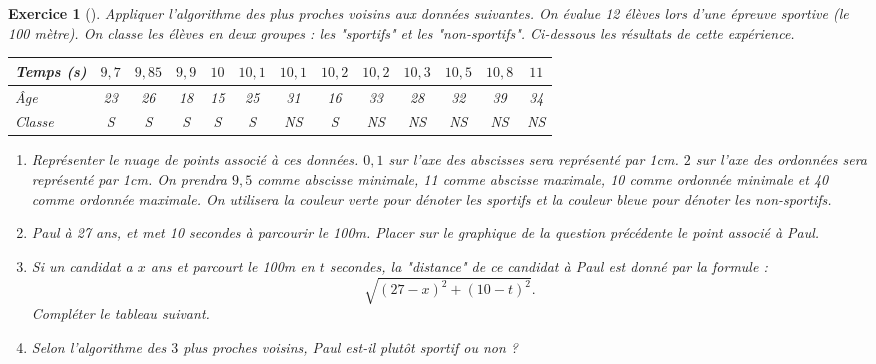 \documentclass[12pt]{article}                   %
\newcounter{exoscount}
\theoremstyle{exercicestyle}
\newtheorem{exos}[exoscount]{Exercice}
\newenvironment{exo}[2]
  {
   \begin{exos}[#1]
   \leavevmode
   \marginpar{\hfill $#2 $ }}
  {\end{exos}}
\theoremstyle{break2}
\theoremstyle{break3}
\begin{document}
\begin{exo}{}{  }
    Appliquer l'algorithme des plus proches voisins aux données suivantes. On évalue 12 élèves lors d'une épreuve sportive (le 100 mètre). On classe les élèves en deux groupes : les "sportifs" et les "non-sportifs". Ci-dessous les résultats de cette expérience.

    \begin{center}
        \renewcommand{\arraystretch}{1.5}
    \begin{tabular}{|M{2cm}|c|c|c|c|c|c|c|c|c|c|c|c|}
        \hline
        Temps (s) & $9,7$ & $9,85$ & $9,9$ & $10$ & $10,1$ & $10,1$ & $10,2$ & $10,2$ & $10,3$ & $10,5$ & $10,8$ & $11$ \\
    \hline
    Âge & 23 & 26 & 18 & 15 & 25 & 31 & 16 & 33 & 28 & 32 & 39 & 34 \\
    \hline 
    Classe & S & S & S & S & S & NS & S & NS & NS & NS & NS & NS \\
    \hline 
    \end{tabular}
    \end{center}

    \begin{enumerate}
        \item Représenter le nuage de points associé à ces données. $0,1$ sur l'axe des abscisses sera représenté par 1cm. $2$ sur l'axe des ordonnées sera représenté par 1cm. On prendra $9,5$ comme abscisse minimale, 11 comme abscisse maximale, 10 comme ordonnée minimale et 40 comme ordonnée maximale. On utilisera la couleur verte pour dénoter les sportifs et la couleur bleue pour dénoter les non-sportifs.
        \item Paul à 27 ans, et met 10 secondes à parcourir le 100m. Placer sur le graphique de la question précédente le point associé à Paul. 
        \item Si un candidat a $x$ ans et parcourt le 100m en $t$ secondes, la "distance" de ce candidat à Paul est donné par la formule :
            $$ 
            \sqrt{(27 - x)^2 + (10-t)^2}.
            $$
            Compléter le tableau suivant.
            \begin{center}
            \noindent \hspace{-1.2cm}
            \end{center}
    \item Selon l'algorithme des $3$ plus proches voisins, Paul est-il plutôt sportif ou non ?


\end{enumerate}
\end{exo}
\end{document}
